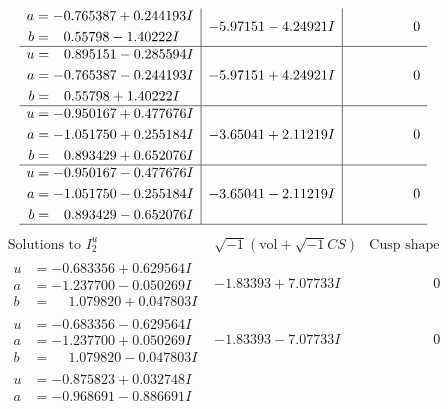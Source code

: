 \documentclass[1p]{elsarticle_modified}
\theoremstyle{definition}
\newcommand{\I}{\sqrt{-1}}
\begin{document}
$$\begin{array}{c|c|c}
\begin{aligned}
a &= -0.765387 + 0.244193 I \\
b &= \phantom{-}0.55798 - 1.40222 I\end{aligned}
 & -5.97151 - 4.24921 I & \phantom{-0.000000 } 0 \\ \hline\begin{aligned}
u &= \phantom{-}0.895151 - 0.285594 I \\
a &= -0.765387 - 0.244193 I \\
b &= \phantom{-}0.55798 + 1.40222 I\end{aligned}
 & -5.97151 + 4.24921 I & \phantom{-0.000000 } 0 \\ \hline\begin{aligned}
u &= -0.950167 + 0.477676 I \\
a &= -1.051750 + 0.255184 I \\
b &= \phantom{-}0.893429 + 0.652076 I\end{aligned}
 & -3.65041 + 2.11219 I & \phantom{-0.000000 } 0 \\ \hline\begin{aligned}
u &= -0.950167 - 0.477676 I \\
a &= -1.051750 - 0.255184 I \\
b &= \phantom{-}0.893429 - 0.652076 I\end{aligned}
 & -3.65041 - 2.11219 I & \phantom{-0.000000 } 0\\
 \hline 
 \end{array}$$\newpage$$\begin{array}{c|c|c}  
\text{Solutions to }I^u_{2}& \I (\text{vol} + \sqrt{-1}CS) & \text{Cusp shape}\\
 \hline 
\begin{aligned}
u &= -0.683356 + 0.629564 I \\
a &= -1.237700 - 0.050269 I \\
b &= \phantom{-}1.079820 + 0.047803 I\end{aligned}
 & -1.83393 + 7.07733 I & \phantom{-0.000000 } 0 \\ \hline\begin{aligned}
u &= -0.683356 - 0.629564 I \\
a &= -1.237700 + 0.050269 I \\
b &= \phantom{-}1.079820 - 0.047803 I\end{aligned}
 & -1.83393 - 7.07733 I & \phantom{-0.000000 } 0 \\ \hline\begin{aligned}
u &= -0.875823 + 0.032748 I \\
a &= -0.968691 - 0.886691 I \\

\end{aligned}
\end{array}$$
\end{document}
